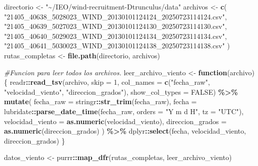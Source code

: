 \documentclass[
]{article}
\newenvironment{Shaded}{\begin{snugshade}}{\end{snugshade}}
\newcommand{\AttributeTok}[1]{\textcolor[rgb]{0.13,0.29,0.53}{#1}}
\newcommand{\CommentTok}[1]{\textcolor[rgb]{0.56,0.35,0.01}{\textit{#1}}}
\newcommand{\ConstantTok}[1]{\textcolor[rgb]{0.56,0.35,0.01}{#1}}
\newcommand{\ControlFlowTok}[1]{\textcolor[rgb]{0.13,0.29,0.53}{\textbf{#1}}}
\newcommand{\DecValTok}[1]{\textcolor[rgb]{0.00,0.00,0.81}{#1}}
\newcommand{\FunctionTok}[1]{\textcolor[rgb]{0.13,0.29,0.53}{\textbf{#1}}}
\newcommand{\NormalTok}[1]{#1}
\newcommand{\OtherTok}[1]{\textcolor[rgb]{0.56,0.35,0.01}{#1}}
\newcommand{\SpecialCharTok}[1]{\textcolor[rgb]{0.81,0.36,0.00}{\textbf{#1}}}
\newcommand{\StringTok}[1]{\textcolor[rgb]{0.31,0.60,0.02}{#1}}
\begin{document}
\begin{Shaded}
\begin{Highlighting}[]
\NormalTok{directorio }\OtherTok{\textless{}{-}} \StringTok{"\textasciitilde{}/IEO/wind{-}recruitment{-}Dtrunculus/data"}
\NormalTok{archivos }\OtherTok{\textless{}{-}} \FunctionTok{c}\NormalTok{(}
  \StringTok{"21405\_40638\_5028023\_WIND\_20130101124124\_20250723114124.csv"}\NormalTok{,}
  \StringTok{"21405\_40639\_5027023\_WIND\_20130101124130\_20250723114130.csv"}\NormalTok{,}
  \StringTok{"21405\_40640\_5029023\_WIND\_20130101124134\_20250723114134.csv"}\NormalTok{,}
  \StringTok{"21405\_40641\_5030023\_WIND\_20130101124138\_20250723114138.csv"}
\NormalTok{)}
\NormalTok{rutas\_completas }\OtherTok{\textless{}{-}} \FunctionTok{file.path}\NormalTok{(directorio, archivos)}

\CommentTok{\#Funcion para leer todos los archivos.}
\NormalTok{leer\_archivo\_viento }\OtherTok{\textless{}{-}} \ControlFlowTok{function}\NormalTok{(archivo) \{}
\NormalTok{  readr}\SpecialCharTok{::}\FunctionTok{read\_tsv}\NormalTok{(archivo, }\AttributeTok{skip =} \DecValTok{1}\NormalTok{,}
                  \AttributeTok{col\_names =} \FunctionTok{c}\NormalTok{(}\StringTok{"fecha\_raw"}\NormalTok{, }
                                \StringTok{"velocidad\_viento"}\NormalTok{, }
                                \StringTok{"direccion\_grados"}\NormalTok{),}
                  \AttributeTok{show\_col\_types =} \ConstantTok{FALSE}\NormalTok{) }\SpecialCharTok{\%\textgreater{}\%}
    \FunctionTok{mutate}\NormalTok{(}
      \AttributeTok{fecha\_raw =}\NormalTok{ stringr}\SpecialCharTok{::}\FunctionTok{str\_trim}\NormalTok{(fecha\_raw),}
      \AttributeTok{fecha =}\NormalTok{ lubridate}\SpecialCharTok{::}\FunctionTok{parse\_date\_time}\NormalTok{(fecha\_raw, }\AttributeTok{orders =} \StringTok{"Y m d H"}\NormalTok{, }\AttributeTok{tz =} \StringTok{"UTC"}\NormalTok{),}
      \AttributeTok{velocidad\_viento =} \FunctionTok{as.numeric}\NormalTok{(velocidad\_viento),}
      \AttributeTok{direccion\_grados =} \FunctionTok{as.numeric}\NormalTok{(direccion\_grados)}
\NormalTok{    ) }\SpecialCharTok{\%\textgreater{}\%}
\NormalTok{    dplyr}\SpecialCharTok{::}\FunctionTok{select}\NormalTok{(fecha, velocidad\_viento, direccion\_grados)}
\NormalTok{\}}

\NormalTok{datos\_viento }\OtherTok{\textless{}{-}}\NormalTok{ purrr}\SpecialCharTok{::}\FunctionTok{map\_dfr}\NormalTok{(rutas\_completas, }
\NormalTok{                               leer\_archivo\_viento)}
\end{Highlighting}
\end{Shaded}
\end{document}
